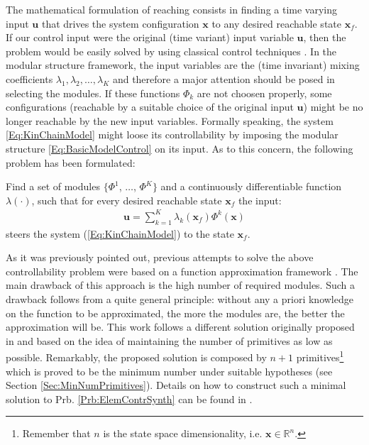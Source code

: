 \documentclass{svmult}
\newcommand{\x}{\mathbf {x}}
\begin{document}
The mathematical formulation of reaching consists in finding a time varying input
$\mathbf u$ that drives the system configuration $\mathbf x$ to any desired 
reachable state $\mathbf x_f$. If our control input were the original 
(time variant) input variable $\mathbf u$, then the problem would be easily 
solved by using classical control techniques
\cite{MurrayLeeSastry}. In the modular structure framework, the input
variables are the (time invariant) mixing coefficients 
$\lambda_1, \lambda_2, \dots, \lambda_K$ and therefore a major attention 
should be posed in selecting the modules. If these functions $\Phi_k$ are not
choosen properly, some configurations (reachable by a suitable
choice of the original input $\mathbf u$) might be no longer reachable 
by the new input variables. Formally speaking, the system 
\eqref{Eq:KinChainModel} might loose its controllability by imposing
the modular structure \eqref{Eq:BasicModelControl} on its input.
As to this concern, the following problem has been formulated:

\begin{problem} \label{Prb:ElemContrSynth}
Find a set of modules $\{\Phi^1$, $\dots$,
$\Phi^K\}$ and a continuously differentiable function
$\lambda(\cdot)$, such that for every desired reachable state 
$\mathbf x_f$ the input:
\begin{eqnarray} \label{Eq:CombinedInput}
\mathbf u = \sum_{k=1}^K \lambda_k(\mathbf x_f) \Phi^k(\mathbf x)
\end{eqnarray}
steers the system (\ref{Eq:KinChainModel}) to the state $\mathbf x_f$.
\end{problem}

As it was previously pointed out, previous attempts to solve 
the above controllability problem were based on a function 
approximation framework \cite{WolpertKawato1998,MussaIvaldi1992BiolCyb}.
The main drawback of this approach is the high number of required modules.
Such a drawback follows from a quite general principle: without any a priori knowledge on
the function to be approximated, the more the modules are, the better 
the approximation will be. This work follows a different solution 
originally proposed in \cite{NoriFrezzaNolcos04} and based on the
idea of maintaining the number of primitives as low as possible.
Remarkably, the proposed solution is composed by $n+1$ primitives\footnote{
Remember that $n$ is the state space dimensionality, i.e. $\x \in \mathbb R^n$.}
which is proved to be the minimum number under suitable hypotheses 
(see Section \ref{Sec:MinNumPrimitives}). Details on how to 
construct such a minimal solution to Prb. \ref{Prb:ElemContrSynth}
can be found in \cite{NoriBiolCyb2005}.
\end{document}
